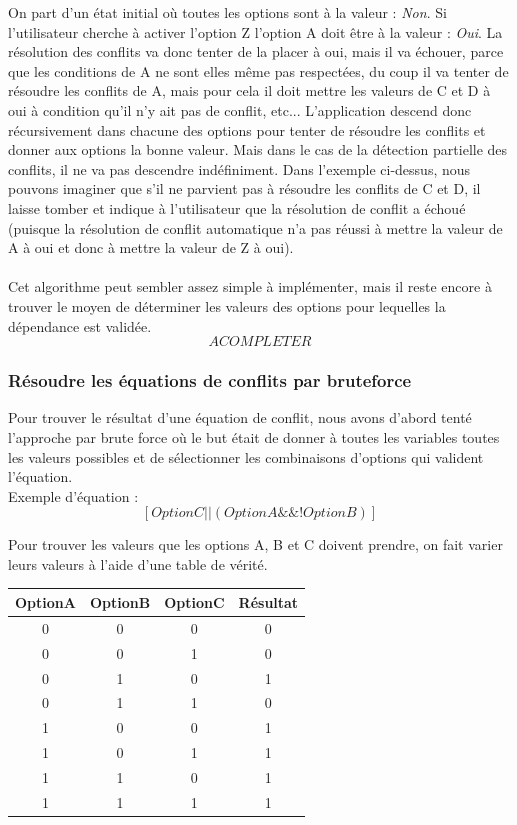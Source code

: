 \documentclass[16pts]{report}
\begin{document}
On part d'un état initial où toutes les options sont à la valeur :
\textit{Non}.  Si l'utilisateur cherche à activer l'option Z l'option A doit
être à la valeur : \textit{Oui}. La résolution des conflits va donc tenter de
la placer à oui, mais il va échouer, parce que les conditions de A ne sont elles
même pas respectées, du coup il va tenter de résoudre les conflits de A, mais
pour cela il doit mettre les valeurs de C et D à oui à condition qu'il n'y ait
pas de conflit, etc...  L'application descend donc récursivement dans chacune
des options pour tenter de résoudre les conflits et donner aux options la bonne
valeur. Mais dans le cas de la détection partielle des conflits, il ne va pas
descendre indéfiniment. Dans l'exemple ci-dessus, nous pouvons imaginer que s'il ne parvient pas à résoudre les conflits de C et D, il laisse tomber et
indique à l'utilisateur que la résolution de conflit a échoué (puisque la
résolution de conflit automatique n'a pas réussi à mettre la valeur de A à oui
et donc à mettre la valeur de Z à oui).\\
\\

Cet algorithme peut sembler assez simple à implémenter, mais il reste encore
à trouver le moyen de déterminer les valeurs des options pour lequelles la
dépendance est validée.\\

\[A COMPLETER\]

            \subsubsection{Résoudre les équations de conflits par bruteforce}
            \label{sub:Résoudre les équations de conflits par bruteforce}

Pour trouver le résultat d'une équation de conflit, nous avons d'abord tenté
l'approche par brute force où le but était de donner à toutes les variables
toutes les valeurs possibles et de sélectionner les combinaisons d'options qui
valident l'équation.
\\

Exemple d'équation :
\[[OptionC || (OptionA \&\& !OptionB)]\]

Pour trouver les valeurs que les options A, B et C doivent prendre, on fait
varier leurs valeurs à l'aide d'une table de vérité.  \\
\begin{tabular}{|c|c|c||c|}
    \hline
    OptionA & OptionB & OptionC & Résultat\\
    \hline
    \hline
    0 & 0 & 0 & 0\\
    \hline
    0 & 0 & 1 & 0\\
    \hline
    0 & 1 & 0 & 1\\
    \hline
    0 & 1 & 1 & 0\\
    \hline
    1 & 0 & 0 & 1\\
    \hline
    1 & 0 & 1 & 1\\
    \hline
    1 & 1 & 0 & 1\\
    \hline
    1 & 1 & 1 & 1\\
    \hline
\end{tabular}
\end{document}
